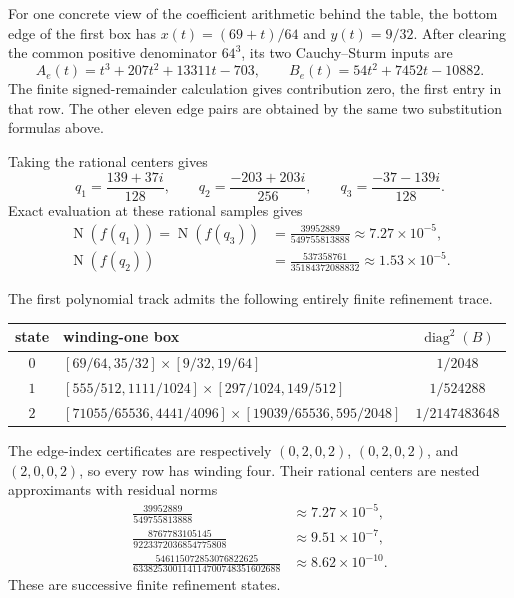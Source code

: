 \documentclass[11pt]{article}
\newcommand{\Norm}[1]{\operatorname{N}\!\left(#1\right)}
\newcommand{\diamq}{\operatorname{diag}^{2}}
\begin{document}
For one concrete view of the coefficient arithmetic behind the table,
the bottom edge of the first box has
$x(t)=(69+t)/64$ and $y(t)=9/32$.  After clearing the common positive
denominator $64^3$, its two Cauchy--Sturm inputs are
\[
 A_e(t)=t^3+207t^2+13311t-703,
 \qquad
 B_e(t)=54t^2+7452t-10882.
\]
The finite signed-remainder calculation gives contribution zero, the first
entry in that row.  The other eleven edge pairs are obtained by the same two
substitution formulas above.

Taking the rational centers gives
\[
 q_1=\frac{139+37i}{128},\qquad
 q_2=\frac{-203+203i}{256},\qquad
 q_3=\frac{-37-139i}{128}.
\]
Exact evaluation at these rational samples gives
\begin{align*}
 \Norm{f(q_1)}=\Norm{f(q_3)}
   &=\frac{39952889}{549755813888}
     \approx 7.27\mathbin{\times}10^{-5},\\
 \Norm{f(q_2)}
   &=\frac{537358761}{35184372088832}
     \approx 1.53\mathbin{\times}10^{-5}.
\end{align*}

The first polynomial track admits the following entirely finite refinement trace.

\begin{center}
\small
\begin{tabularx}{\textwidth}{@{}c>{\raggedright\arraybackslash}Xc@{}}
\toprule
state & winding-one box & $\diamq(B)$\\
\midrule
$0$ & $[69/64,35/32]\times[9/32,19/64]$
    & $1/2048$\\
$1$ & $[555/512,1111/1024]\times[297/1024,149/512]$
    & $1/524288$\\
$2$ & $[71055/65536,4441/4096]\times[19039/65536,595/2048]$
    & $1/2147483648$\\
\bottomrule
\end{tabularx}
\end{center}
The edge-index certificates are respectively $(0,2,0,2)$,
$(0,2,0,2)$, and $(2,0,0,2)$, so every row has winding four.  Their rational
centers are nested approximants with residual norms
\[
 \begin{aligned}
 \frac{39952889}{549755813888}
   &\approx7.27\mathbin{\times}10^{-5},\\
 \frac{8767783105145}{9223372036854775808}
   &\approx9.51\mathbin{\times}10^{-7},\\
 \frac{546115072853076822625}{633825300114114700748351602688}
   &\approx8.62\mathbin{\times}10^{-10}.
 \end{aligned}
\]
These are successive finite refinement states.
\end{document}
